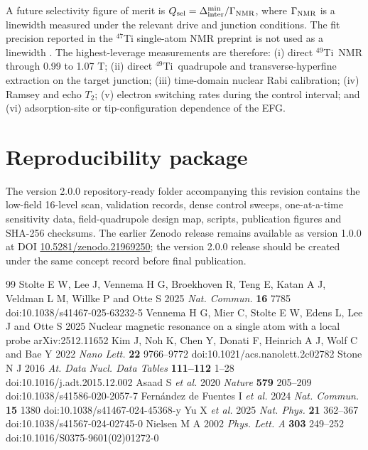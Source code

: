 \documentclass[11pt]{article}
\newcommand{\Ti}{$^{49}$Ti}
\newcommand{\DeltaInter}{\Delta_{\mathrm{inter}}^{\min}}
\begin{document}
A future selectivity figure of merit is $Q_{\rm sel}=\DeltaInter/\Gamma_{\rm NMR}$, where $\Gamma_{\rm NMR}$ is a linewidth measured under the relevant drive and junction conditions. The fit precision reported in the $^{47}$Ti single-atom NMR preprint is not used as a linewidth \cite{vennema2025}. The highest-leverage measurements are therefore: (i) direct \Ti\ NMR through 0.99 to 1.07 T; (ii) direct \Ti\ quadrupole and transverse-hyperfine extraction on the target junction; (iii) time-domain nuclear Rabi calibration; (iv) Ramsey and echo $T_2$; (v) electron switching rates during the control interval; and (vi) adsorption-site or tip-configuration dependence of the EFG.

\section{Reproducibility package}
The version 2.0.0 repository-ready folder accompanying this revision contains the low-field 16-level scan, validation records, dense control sweeps, one-at-a-time sensitivity data, field-quadrupole design map, scripts, publication figures and SHA-256 checksums. The earlier Zenodo release remains available as version 1.0.0 at DOI \href{https://doi.org/10.5281/zenodo.21969250}{10.5281/zenodo.21969250}; the version 2.0.0 release should be created under the same concept record before final publication.

\begin{thebibliography}{99}
 Stolte E W, Lee J, Vennema H G, Broekhoven R, Teng E, Katan A J, Veldman L M, Willke P and Otte S 2025 \emph{Nat. Commun.} \textbf{16} 7785 doi:10.1038/s41467-025-63232-5
 Vennema H G, Mier C, Stolte E W, Edens L, Lee J and Otte S 2025 Nuclear magnetic resonance on a single atom with a local probe arXiv:2512.11652
 Kim J, Noh K, Chen Y, Donati F, Heinrich A J, Wolf C and Bae Y 2022 \emph{Nano Lett.} \textbf{22} 9766--9772 doi:10.1021/acs.nanolett.2c02782
 Stone N J 2016 \emph{At. Data Nucl. Data Tables} \textbf{111--112} 1--28 doi:10.1016/j.adt.2015.12.002
 Asaad S \emph{et al.} 2020 \emph{Nature} \textbf{579} 205--209 doi:10.1038/s41586-020-2057-7
 Fern\'andez de Fuentes I \emph{et al.} 2024 \emph{Nat. Commun.} \textbf{15} 1380 doi:10.1038/s41467-024-45368-y
 Yu X \emph{et al.} 2025 \emph{Nat. Phys.} \textbf{21} 362--367 doi:10.1038/s41567-024-02745-0
 Nielsen M A 2002 \emph{Phys. Lett. A} \textbf{303} 249--252 doi:10.1016/S0375-9601(02)01272-0
\end{thebibliography}
\end{document}
